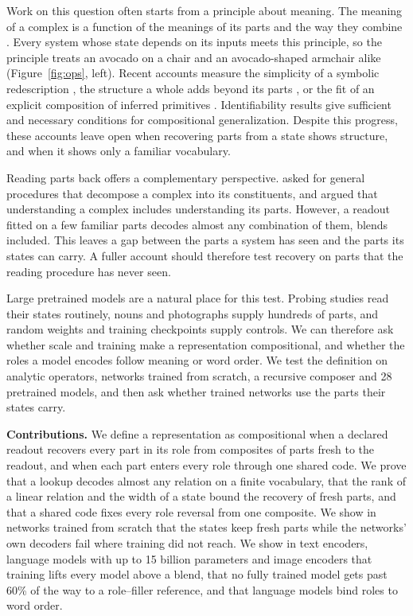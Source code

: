 Work on this question often starts from a principle about meaning. The meaning of a complex is a function of the meanings of its parts and the way they combine \citep{montague1970}. Every system whose state depends on its inputs meets this principle, so the principle treats an avocado on a chair and an avocado-shaped armchair alike (Figure~\ref{fig:ops}, left). Recent accounts measure the simplicity of a symbolic redescription \citep{elmoznino2024}, the structure a whole adds beyond its parts \citep{elmoznino2026}, or the fit of an explicit composition of inferred primitives \citep{andreas2019}. Identifiability results give sufficient \citep{lachapelle2023,wiedemer2024} and necessary \citep{uselis2026} conditions for compositional generalization. Despite this progress, these accounts leave open when recovering parts from a state shows structure, and when it shows only a familiar vocabulary.

Reading parts back offers a complementary perspective. \citet{vangelder1990} asked for general procedures that decompose a complex into its constituents, and \citet{fodor2002} argued that understanding a complex includes understanding its parts. However, a readout fitted on a few familiar parts decodes almost any combination of them, blends included. This leaves a gap between the parts a system has seen and the parts its states can carry. A fuller account should therefore test recovery on parts that the reading procedure has never seen.

Large pretrained models are a natural place for this test. Probing studies read their states routinely, nouns and photographs supply hundreds of parts, and random weights and training checkpoints supply controls. We can therefore ask whether scale and training make a representation compositional, and whether the roles a model encodes follow meaning or word order. We test the definition on analytic operators, networks trained from scratch, a recursive composer and 28 pretrained models, and then ask whether trained networks use the parts their states carry.

\textbf{Contributions.} We define a representation as compositional when a declared readout recovers every part in its role from composites of parts fresh to the readout, and when each part enters every role through one shared code. We prove that a lookup decodes almost any relation on a finite vocabulary, that the rank of a linear relation and the width of a state bound the recovery of fresh parts, and that a shared code fixes every role reversal from one composite. We show in networks trained from scratch that the states keep fresh parts while the networks' own decoders fail where training did not reach. We show in text encoders, language models with up to 15 billion parameters and image encoders that training lifts every model above a blend, that no fully trained model gets past 60\% of the way to a role--filler reference, and that language models bind roles to word order.

